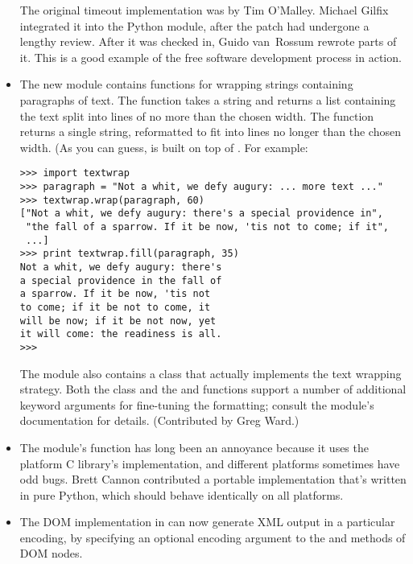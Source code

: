 \documentclass{howto}
\begin{document}
\begin{itemize}
The original timeout implementation was by Tim O'Malley.  Michael
Gilfix integrated it into the Python  module, after the
patch had undergone a lengthy review.  After it was checked in, Guido
van~Rossum rewrote parts of it.  This is a good example of the free
software development process in action.

\item The new  module contains functions for wrapping
strings containing paragraphs of text.  The  function takes a string and returns a list containing
the text split into lines of no more than the chosen width.  The
 function returns a single
string, reformatted to fit into lines no longer than the chosen width.
(As you can guess,  is built on top of
.  For example:

\begin{verbatim}
>>> import textwrap
>>> paragraph = "Not a whit, we defy augury: ... more text ..."
>>> textwrap.wrap(paragraph, 60)
["Not a whit, we defy augury: there's a special providence in", 
 "the fall of a sparrow. If it be now, 'tis not to come; if it", 
 ...]
>>> print textwrap.fill(paragraph, 35)
Not a whit, we defy augury: there's
a special providence in the fall of
a sparrow. If it be now, 'tis not
to come; if it be not to come, it
will be now; if it be not now, yet
it will come: the readiness is all.
>>> 
\end{verbatim}

The module also contains a  class that actually
implements the text wrapping strategy.   Both the 
 class and the  and
 functions support a number of additional keyword
arguments for fine-tuning the formatting; consult the module's
documentation for details. 
(Contributed by Greg Ward.)

\item The  module's  function has
long been an annoyance because it uses the platform C library's 
 implementation, and different platforms
sometimes have odd bugs.  Brett Cannon contributed a portable
implementation that's written in pure Python, which should behave
identically on all platforms.

\item The DOM implementation
in  can now generate XML output in a
particular encoding, by specifying an optional encoding argument to
the  and  methods of DOM nodes.

\end{itemize}
\end{document}
